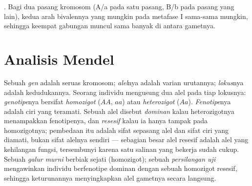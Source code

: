 \begin{omfigure}

{\small {}. Bagi dua pasang kromosom (A/a pada satu
pasang, B/b pada pasang yang lain), kedua arah bivalennya yang mungkin
pada metafase I sama-sama mungkin, sehingga keempat gabungan 
muncul sama banyak di antara gametnya.}
\end{omfigure}

\section{Analisis Mendel}

\begin{definition}\label{def:b2:meiosis-heredity:vocabulary}
%
Sebuah \emph{gen} adalah seruas kromosom; \emph{alel}nya adalah varian
urutannya; \emph{lokus}nya adalah kedudukannya. Seorang individu
 mengusung dua alel pada tiap lokusnya: \emph{genotipe}nya
bersifat \emph{homozigot} ($AA$, $aa$) atau \emph{heterozigot} ($Aa$).
\emph{Fenotipe}nya adalah ciri yang teramati. Sebuah alel disebut
\emph{dominan} kalau heterozigotnya menampakkan fenotipenya, dan
\emph{resesif} kalau ia hanya tampak pada homozigotnya; pembedaan itu
adalah sifat sepasang alel dan sifat ciri yang diamati, bukan sifat
alelnya sendiri --- sebagian besar alel resesif adalah alel yang
kehilangan fungsi, tersembunyi karena satu salinan yang bekerja sudah
cukup. Sebuah \emph{galur murni} berbiak sejati (homozigot); sebuah
\emph{persilangan uji} mengawinkan individu berfenotipe dominan dengan
sebuah homozigot resesif, sehingga keturunannya menyingkapkan alel
gametnya secara langsung.
\end{definition}

